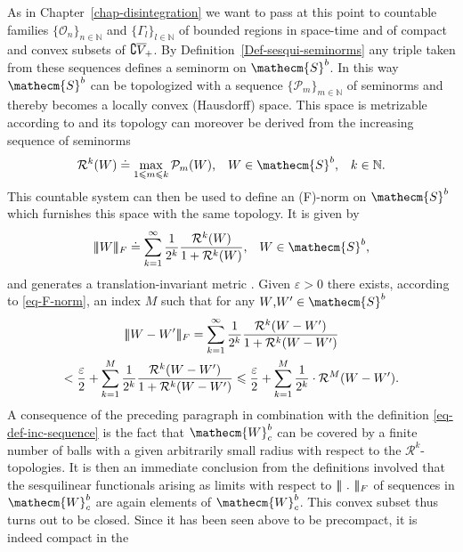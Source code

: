 \documentclass[11pt,twoside,openright]{report}
\theoremstyle{definition}
\theoremstyle{plain}
\theoremstyle{remark}
\theoremstyle{assumption}
\newcommand{\set}[1]{\{ #1 \}}
\newcommand{\FNorm}[1]{\lvert \negthinspace \lvert \negthinspace \lvert
  #1 \rvert \negthinspace \rvert \negthinspace \rvert_F}
\newcommand{\Pm}{\mathcal{P}_m}
\newcommand{\Pmx}[1]{\mathcal{P}_m ( #1 )}
\newcommand{\Rk}{\mathcal{R}^k}
\newcommand{\Rkx}[1]{\mathcal{R}^k ( #1 )}
\newcommand{\RMx}[1]{\mathcal{R}^M ( #1 )}
\newcommand{\Nbb}{\mathbb{N}}
\newcommand{\Secm}{\mathecm{S}}
\newcommand{\Wecm}{\mathecm{W}}
\newcommand{\Oscr}{\mathscr{O}}
\newcommand{\fwcone}{\overline{V}_{\negthinspace +}}
\begin{document}
As in Chapter~\ref{chap-disintegration} we want to pass at this point
to countable families $\set{\Oscr_n}_{n \in \Nbb}$ and
$\set{\Gamma_l}_{l \in \Nbb}$ of bounded regions in space-time and of
compact and convex subsets of $\complement \fwcone$. By
Definition~\ref{Def-sesqui-seminorms} any triple taken from these
sequences defines a seminorm on $\Secm^b$. In this way $\Secm^b$ can
be topologized with a sequence $\set{\Pm}_{m \in \Nbb}$ of
seminorms and thereby becomes a locally convex (Hausdorff) space. This
space is metrizable according to \cite[Chapter~Four,
\S\,18,\,2.(2)]{koethe:1983} and its topology can moreover be derived
from the increasing sequence of seminorms
\begin{equation}
  \label{eq-def-inc-sequence}
  \Rkx{W} \doteq \max_{1 \leqslant m \leqslant k} \Pmx{W} \text{,}
  \quad W \in \Secm^b \text{,} \quad k \in \Nbb \text{.}
\end{equation}
This countable system can then be used to define an (F)-norm
\cite[p.\,163]{koethe:1983} on $\Secm^b$ which furnishes this space
with the same topology. It is given by
\begin{equation}
  \label{eq-F-norm}
  \FNorm{W} \doteq \sum_{k = 1}^\infty \frac{1}{2^k} \frac{\Rkx{W}}{1
    + \Rkx{W}} \text{,} \quad W \in \Secm^b \text{,}
\end{equation}
and generates a translation-invariant metric \cite[Chapter~Four,
\S\,18,\,2.(3)]{koethe:1983}. Given $\varepsilon > 0$ there exists,
according to \eqref{eq-F-norm}, an index $M$ such that for any $W
\text{,} W' \in \Secm^b$
\begin{multline}
  \label{eq-F-norm-metric-estimate}
  \FNorm{W - W'} = \sum_{k = 1}^\infty \frac{1}{2^k} \frac{\Rkx{W -
  W'}}{1 + \Rkx{W - W'}} \\
  < \frac{\varepsilon}{2} + \sum_{k = 1}^M \frac{1}{2^k} \frac{\Rkx{W
  - W'}}{1 + \Rkx{W - W'}} \leqslant \frac{\varepsilon}{2} + \sum_{k =
  1}^M \frac{1}{2^k} \cdot \RMx{W - W'} \text{.}
\end{multline}
A consequence of the preceding paragraph in combination with the
definition \eqref{eq-def-inc-sequence} is the fact that $\Wecm_c^b$
can be covered by a finite number of balls with a given arbitrarily
small radius with respect to the $\Rk$-topologies. It is then an
immediate conclusion from the definitions involved that the
sesquilinear functionals arising as limits with respect to
$\FNorm{~.~}$ of sequences in $\Wecm_c^b$ are again elements of
$\Wecm_c^b$. This convex subset thus turns out to be closed. Since it
has been seen above to be precompact, it is indeed compact in the
\end{document}
